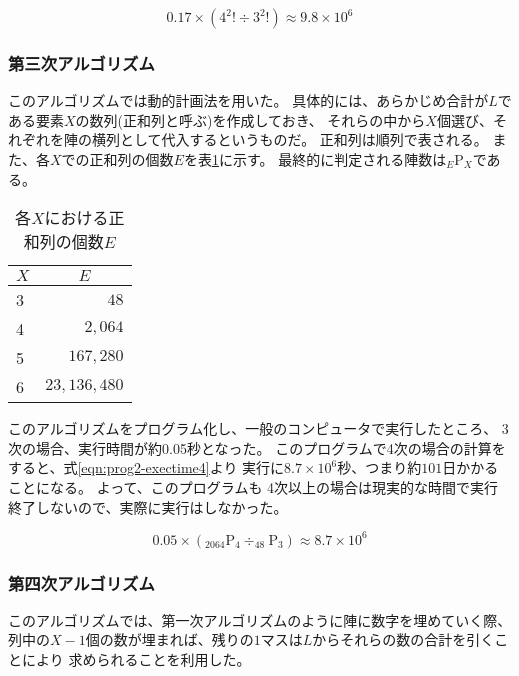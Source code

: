 \begin{equation} \label{eqn:prog1.5-exectime4}
0.17 \times (4^2! \div 3^2!) \approx 9.8 \times 10^6
\end{equation}

\subsubsection{第三次アルゴリズム}
このアルゴリズムでは動的計画法を用いた。
具体的には、あらかじめ合計が$L$である要素$X$の数列(正和列と呼ぶ)を作成しておき、
それらの中から$X$個選び、それぞれを陣の横列として代入するというものだ。
正和列は順列で表される。
また、各$X$での正和列の個数$E$を表\ref{tab:ple-each-X}に示す。
最終的に判定される陣数は$_E \mathrm{P} _X$である。

\begin{table}[htb]
	\begin{center}
	\begin{tabular}{|l|r|}
\hline \hline
\multicolumn{1}{|c|}{$X$} & \multicolumn{1}{|c|}{$E$} \\
\hline \hline
3 & $48$ \\
4 & $2,064$ \\
5 & $167,280$ \\
6 & $23,136,480$ \\
\hline
	\end{tabular}
	\end{center}
	\caption{各$X$における正和列の個数$E$}
	\label{tab:ple-each-X}
\end{table}

このアルゴリズムをプログラム化し、一般のコンピュータで実行したところ、
3次の場合、実行時間が約0.05秒となった。
このプログラムで4次の場合の計算をすると、式\ref{eqn:prog2-exectime4}より
実行に$8.7 \times 10^6$秒、つまり約$101$日かかることになる。
よって、このプログラムも
4次以上の場合は現実的な時間で実行終了しないので、実際に実行はしなかった。

\begin{equation} \label{eqn:prog2-exectime4}
0.05 \times (_{2064} \mathrm{P} _4 \div _{48} \mathrm{P} _3) \approx 8.7 \times 10^6
\end{equation}

\subsubsection{第四次アルゴリズム}
このアルゴリズムでは、第一次アルゴリズムのように陣に数字を埋めていく際、
列中の$X-1$個の数が埋まれば、残りの$1$マスは$L$からそれらの数の合計を引くことにより
求められることを利用した。

